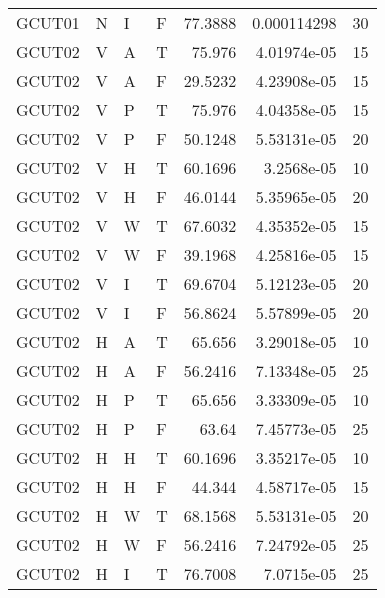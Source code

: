 \begin{longtable}{llllrrr}
    GCUT01   & N         & I         & F          & 77.3888    & 0.000114298 & 30       \\
    GCUT02   & V         & A         & T          & 75.976     & 4.01974e-05 & 15       \\
    GCUT02   & V         & A         & F          & 29.5232    & 4.23908e-05 & 15       \\
    GCUT02   & V         & P         & T          & 75.976     & 4.04358e-05 & 15       \\
    GCUT02   & V         & P         & F          & 50.1248    & 5.53131e-05 & 20       \\
    GCUT02   & V         & H         & T          & 60.1696    & 3.2568e-05  & 10       \\
    GCUT02   & V         & H         & F          & 46.0144    & 5.35965e-05 & 20       \\
    GCUT02   & V         & W         & T          & 67.6032    & 4.35352e-05 & 15       \\
    GCUT02   & V         & W         & F          & 39.1968    & 4.25816e-05 & 15       \\
    GCUT02   & V         & I         & T          & 69.6704    & 5.12123e-05 & 20       \\
    GCUT02   & V         & I         & F          & 56.8624    & 5.57899e-05 & 20       \\
    GCUT02   & H         & A         & T          & 65.656     & 3.29018e-05 & 10       \\
    GCUT02   & H         & A         & F          & 56.2416    & 7.13348e-05 & 25       \\
    GCUT02   & H         & P         & T          & 65.656     & 3.33309e-05 & 10       \\
    GCUT02   & H         & P         & F          & 63.64      & 7.45773e-05 & 25       \\
    GCUT02   & H         & H         & T          & 60.1696    & 3.35217e-05 & 10       \\
    GCUT02   & H         & H         & F          & 44.344     & 4.58717e-05 & 15       \\
    GCUT02   & H         & W         & T          & 68.1568    & 5.53131e-05 & 20       \\
    GCUT02   & H         & W         & F          & 56.2416    & 7.24792e-05 & 25       \\
    GCUT02   & H         & I         & T          & 76.7008    & 7.0715e-05  & 25       \\

\end{longtable}
